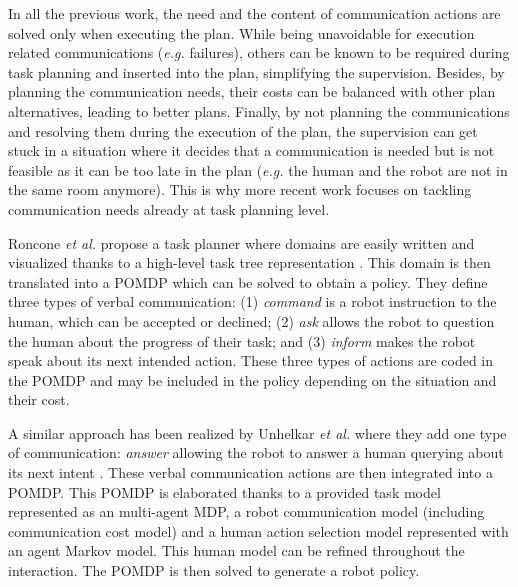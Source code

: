 \documentclass[a4paper,11pt,twoside]{StyleThese}
\begin{document}
In all the previous work, the need and the content of communication actions are solved only when executing the plan. While being unavoidable for execution related communications (\textit{e.g.} failures), others can be known to be required during task planning and inserted into the plan, simplifying the supervision. Besides, by planning the communication needs, their costs can be balanced with other plan alternatives, leading to better plans. Finally, by not planning the communications and resolving them during the execution of the plan, the supervision can get stuck in a situation where it decides that a communication is needed but is not feasible as it can be too late in the plan (\textit{e.g.} the human and the robot are not in the same room anymore). This is why more recent work focuses on tackling communication needs already at task planning level.

Roncone \textit{et al.} propose a task planner where domains are easily written and visualized thanks to a high-level task tree representation \cite{roncone2017transparent}. This domain is then translated into a POMDP which can be solved to obtain a policy. They define three types of verbal communication: (1) \textit{command} is a robot instruction to the human, which can be accepted or declined; (2) \textit{ask} allows the robot to question the human about the progress of their task; and (3) \textit{inform} makes the robot speak about its next intended action. These three types of actions are coded in the POMDP and may be included in the policy depending on the situation and their cost.

A similar approach has been realized by Unhelkar \textit{et al.} where they add one type of communication: \textit{answer} allowing the robot to answer a human querying about its next intent \cite{unhelkar2020decision}. These verbal communication actions are then integrated into a POMDP. This POMDP is elaborated thanks to a provided task model represented as an multi-agent MDP, a robot communication model (including communication cost model) and a human action selection model represented with an agent Markov model. This human model can be refined throughout the interaction. The POMDP is then solved to generate a robot policy.
\end{document}
